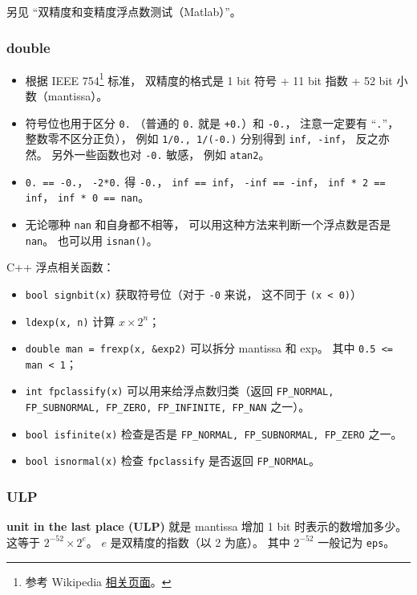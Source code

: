 
\begin{issues}
\issueDraft
\end{issues}

另见 “双精度和变精度浮点数测试（Matlab）”。

\subsubsection{double}
\begin{itemize}
\item 根据 IEEE 754\footnote{参考 Wikipedia \href{https://en.wikipedia.org/wiki/IEEE_754}{相关页面}。} 标准， 双精度的格式是 1 bit 符号 + 11 bit 指数 + 52 bit 小数（mantissa）。
\item 符号位也用于区分 \verb|0.| （普通的 \verb|0.| 就是 \verb|+0.|）和 \verb|-0.|， 注意一定要有 “\verb|.|”， 整数零不区分正负）， 例如 \verb|1/0., 1/(-0.)| 分别得到 \verb|inf, -inf|， 反之亦然。 另外一些函数也对 \verb|-0.| 敏感， 例如 \verb|atan2|。
\item \verb|0. == -0.|， \verb|-2*0.| 得 \verb|-0.|， \verb|inf == inf|， \verb|-inf == -inf|， \verb|inf * 2 == inf|， \verb|inf * 0 == nan|。
\item 无论哪种 \verb|nan| 和自身都不相等， 可以用这种方法来判断一个浮点数是否是 \verb|nan|。 也可以用 \verb|isnan()|。
\end{itemize}

C++ 浮点相关函数：
\begin{itemize}
\item \verb|bool signbit(x)| 获取符号位（对于 \verb|-0| 来说， 这不同于 \verb|(x < 0)|）
\item \verb|ldexp(x, n)| 计算 $x \times 2^n$； 
\item \verb|double man = frexp(x, &exp2)| 可以拆分 mantissa 和 exp。 其中 \verb|0.5 <= man < 1|； 
\item \verb|int fpclassify(x)| 可以用来给浮点数归类（返回 \verb|FP_NORMAL, FP_SUBNORMAL, FP_ZERO, FP_INFINITE, FP_NAN| 之一）。 
\item \verb|bool isfinite(x)| 检查是否是 \verb|FP_NORMAL, FP_SUBNORMAL, FP_ZERO| 之一。
\item \verb|bool isnormal(x)| 检查 \verb|fpclassify| 是否返回 \verb|FP_NORMAL|。 
\end{itemize}


\subsubsection{ULP}
\textbf{unit in the last place (ULP)} 就是 mantissa 增加 1 bit 时表示的数增加多少。 这等于 $2^{-52}\times 2^{e}$。 $e$ 是双精度的指数（以 2 为底）。 其中 $2^{-52}$ 一般记为 \verb|eps|。

